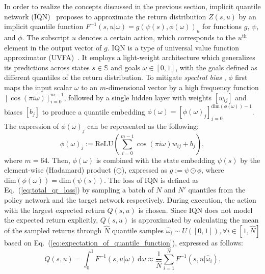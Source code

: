 \documentclass[twoside,11pt]{article}
\newcommand{\statespace}{\mathbb{S}}
\newcommand{\state}{s}
\newcommand{\action}{u}
\newcommand{\utilityexp}{Q}
\newcommand{\utility}{Z}
\newcommand{\quantilefunction}{F^{-1}}
\newcommand{\quantile}{\omega}
\newcommand{\numberofquantiles}{N}
\newcommand{\numberofquantilesamples}{N'}
\newcommand{\numberofquantiletestsamples}{\hat{N}}
\newcommand{\implicitquantilefunction}{g}
\newcommand{\stateembeddingfunction}{\psi}
\newcommand{\cosineembeddingfunction}{\phi}
\newcommand{\cosinedimension}{m}
\begin{document}
In order to realize the concepts discussed in the previous section, implicit quantile network (IQN)~\citep{Dabney2018IQN} proposes to approximate the return distribution $\utility{}(\state{},\action{})$ by an implicit quantile function $\quantilefunction{}(\state{},\action{}\vert\quantile{})=\implicitquantilefunction{}(\stateembeddingfunction{}(\state{}),\cosineembeddingfunction{}(\quantile{}))_\action{}$ for functions $\implicitquantilefunction{}$, $\psi$, and $\phi$. The subscript $\action{}$ denotes a certain action, which corresponds to the $\action{}^\mathrm{th}$ element in the output vector of $\implicitquantilefunction{}$. IQN is a type of universal value function approximator (UVFA)~\citep{Schaul2015UVFA}.  It employs a light-weight architecture which generalizes its predictions across states $\state{}\in\statespace{}$ and goals $\quantile{}\in [0,1]$, with the goals defined as different quantiles of the return distribution.
To mitigate \textit{spectral bias} \citep{rahaman2019spectral}, $\cosineembeddingfunction{}$ first maps the input scalar $\quantile$ to an $\cosinedimension$-dimensional vector by a high frequency function $[\cos(\pi i\quantile)]^{\cosinedimension{}-1}_{i=0}$, followed by a single hidden layer with weights $[w_{ij}]$ and biases $[b_j]$ to produce a quantile embedding $\cosineembeddingfunction{}(\quantile{})=[\cosineembeddingfunction(\quantile{})_j]^{\text{dim}(\cosineembeddingfunction{}(\quantile{}))-1}_{j=0}$. The expression of $\cosineembeddingfunction(\quantile{})_j$ can be represented as the following:
\begin{equation}
\cosineembeddingfunction(\quantile{})_j:=\text{ReLU}(\sum_{i=0}^{\cosinedimension{}-1}\cos(\pi i\quantile)w_{ij}+b_j),
\end{equation}
where $\cosinedimension{}=64$. Then, $\cosineembeddingfunction{}(\quantile{})$ is combined with the state embedding $\stateembeddingfunction{}(\state{})$ by the element-wise (Hadamard) product ($\odot$), expressed as $\implicitquantilefunction:=\stateembeddingfunction{}\odot\cosineembeddingfunction{}$, where $\text{dim}(\cosineembeddingfunction(\quantile{}))=\text{dim}(\stateembeddingfunction(\state{}))$. The loss of IQN is defined as Eq.~(\ref{eq:total_qr_loss}) by sampling a batch of $\numberofquantiles{}$ and $\numberofquantilesamples{}$ quantiles from the policy network and the target network respectively.
During execution, the action with the largest expected return $\utilityexp{}(\state{},\action{})$ is chosen. Since IQN does not model the expected return explicitly, $\utilityexp{}(\state{},\action{})$ is approximated by calculating the mean of the sampled returns through $\numberofquantiletestsamples{}$ quantile samples $\hat\quantile{}_i\sim U([0,1]), \forall i\in[1,\numberofquantiletestsamples{}]$ based on Eq.~(\ref{eq:expectation_of_quantile_function}), expressed as follows:
\begin{equation}
\utilityexp{}(\state{},\action{})=\int_0^1\quantilefunction{}(\state{},\action{}\vert\quantile{})\ \mathrm{d}\quantile\approx\frac{1}{\numberofquantiletestsamples{}}\sum_{i=1}^{\numberofquantiletestsamples{}}\quantilefunction{}(\state{},\action{}\vert\hat\quantile{}_i).
\end{equation}
\end{document}

